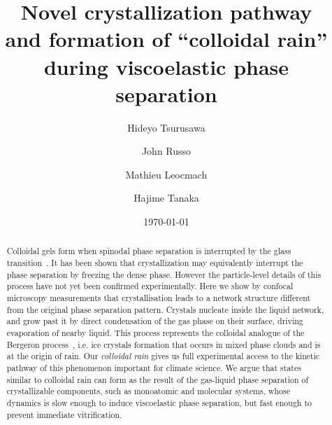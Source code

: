 \documentclass[twocolumn,showpacs,amsmath,amssymb,pre,superscriptaddress]{revtex4}
\begin{document}
\title{Novel crystallization pathway\\and formation of ``colloidal rain'' during viscoelastic phase separation}
\author{Hideyo Tsurusawa}
\author{John Russo}
\author{Mathieu Leocmach}
\author{Hajime Tanaka}


\date{\today}

\begin{abstract}
{
Colloidal gels form when spinodal phase separation is interrupted by the glass transition~\cite{lu2008gelation}. It has been shown that crystallization may equivalently interrupt the phase separation by freezing the dense phase. However the particle-level details of this process have not yet been confirmed experimentally.
Here we show by confocal microscopy measurements that crystallisation leads to a network structure different from the original phase separation pattern. Crystals nucleate inside the liquid network, and grow past it by direct condensation of the gas phase on their surface, driving evaporation of nearby liquid.
This process represents the colloidal analogue of the Bergeron process~\cite{glickman2000glossary}, i.e. ice crystals formation that occurs in mixed phase clouds and is at the origin of rain. Our \emph{colloidal rain} gives us full experimental access to the kinetic pathway of this phenomenon important for climate science.
We argue that states similar to colloidal rain can form as the result of the gas-liquid phase separation of crystallizable components, such as monoatomic and molecular systems, whose dynamics is slow enough to induce viscoelastic phase separation, but fast enough to prevent immediate vitrification.
}
\end{abstract}
 
\end{document}
